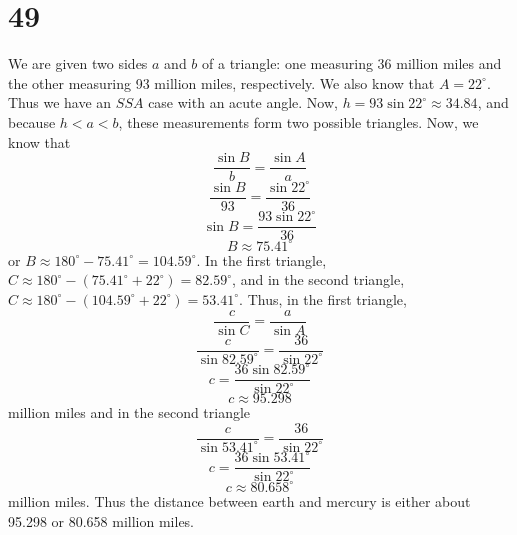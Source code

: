 \documentclass{article}
\theoremstyle{definition}
\newcommand{\?}{\stackrel{?}{=}}
\begin{document}
\section*{49}
We are given two sides $a$ and $b$ of a triangle: one measuring 36 million miles and the other measuring 93 million miles, respectively. 
We also know that $A=22^\circ$. Thus we have an $SSA$ case with an acute angle. Now, $h=93\sin 22^\circ\approx 34.84$, and because $h<a<b$, 
these measurements form two possible triangles. Now, we know that
\[ \frac{\sin B}{b}=\frac{\sin A}{a} \]
\[ \frac{\sin B}{93}=\frac{\sin 22^\circ}{36} \]
\[ \sin B=\frac{93\sin 22^\circ}{36} \]
\[ B\approx 75.41^\circ \]
or $B\approx 180^\circ-75.41^\circ=104.59^\circ$. In the first triangle, $C\approx 180^\circ-(75.41^\circ+22^\circ)=82.59^\circ$, and in the second triangle,
$C\approx 180^\circ-(104.59^\circ+22^\circ)=53.41^\circ$. Thus, in the first triangle,
\[ \frac{c}{\sin C}=\frac{a}{\sin A} \]
\[ \frac{c}{\sin 82.59^\circ}=\frac{36}{\sin 22^\circ} \]
\[ c=\frac{36\sin 82.59^\circ}{\sin 22^\circ} \]
\[ c\approx 95.298 \] million miles
and in the second triangle
\[ \frac{c}{\sin 53.41^\circ}=\frac{36}{\sin 22^\circ} \]
\[ c=\frac{36\sin 53.41^\circ}{\sin 22^\circ} \]
\[ c\approx 80.658^\circ \]
million miles. Thus the distance between earth and mercury is either about 95.298 or 80.658 million miles.
\end{document}
